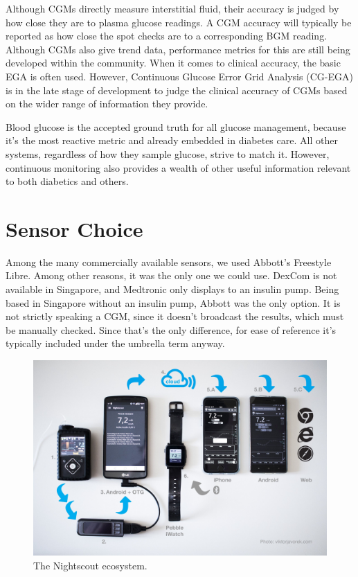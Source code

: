 Although CGMs directly measure interstitial fluid, their accuracy is judged by how close they are to plasma glucose readings. A CGM accuracy will typically be reported as how close the spot checks are to a corresponding BGM reading. Although CGMs also give trend data, performance metrics for this are still being developed within the community. When it comes to clinical accuracy, the basic EGA is often used. However, Continuous Glucose Error Grid Analysis (CG-EGA) is in the late stage of development to judge the clinical accuracy of CGMs based on the wider range of information they provide. 

Blood glucose is the accepted ground truth for all glucose management, because it’s the most reactive metric and already embedded in diabetes care. All other systems, regardless of how they sample glucose, strive to match it. However, continuous monitoring also provides a wealth of other useful information relevant to both diabetics and others.

\section{Sensor Choice}

Among the many commercially available sensors, we used Abbott’s Freestyle Libre. Among other reasons, it was the only one we could use. DexCom is not available in Singapore, and Medtronic only displays to an insulin pump. Being based in Singapore without an insulin pump, Abbott was the only option. It is not strictly speaking a CGM, since it doesn’t broadcast the results, which must be manually checked. Since that’s the only difference, for ease of reference it’s typically included under the umbrella term anyway.

\begin{figure}[ht]
\centering\includegraphics[width=1.0\linewidth]{images/nightscout}
\caption{The Nightscout ecosystem.}
\label{fig:nightscout}
\end{figure}

